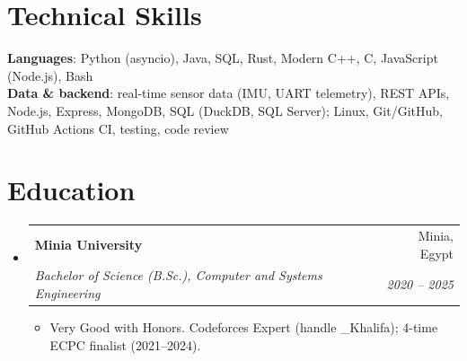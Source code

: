 \documentclass[letterpaper,11pt]{article}
\makeatletter
\newcommand{\resumeItem}[1]{
  \item\small{
    {#1 \vspace{-2pt}}
  }
}
\newcommand{\resumeSubheading}[4]{
  \vspace{-2pt}\item
    \begin{tabular*}{0.97\textwidth}[t]{l@{\extracolsep{\fill}}r}
      \textbf{#1} & #2 \\
      \textit{\small#3} & \textit{\small #4} \\
    \end{tabular*}\vspace{-7pt}
}
\newcommand{\resumeSubHeadingListStart}{\begin{itemize}[leftmargin=0.15in, label={}]}
\newcommand{\resumeSubHeadingListEnd}{\end{itemize}}
\newcommand{\resumeItemListStart}{\begin{itemize}}
\newcommand{\resumeItemListEnd}{\end{itemize}\vspace{-5pt}}
\makeatother
\begin{document}
%
\section{Technical Skills}
 \begin{itemize}[leftmargin=0.15in, label={}]
    \small{\item{
     \textbf{Languages}{: Python (asyncio), Java, SQL, Rust, Modern C++, C, JavaScript (Node.js), Bash} \\
     \textbf{Data \& backend}{: real-time sensor data (IMU, UART telemetry), REST APIs, Node.js, Express, MongoDB, SQL (DuckDB, SQL Server); Linux, Git/GitHub, GitHub Actions CI, testing, code review}
    }}
 \end{itemize}

\section{Education}
  \resumeSubHeadingListStart
    \resumeSubheading
      {Minia University}{Minia, Egypt}
      {Bachelor of Science (B.Sc.), Computer and Systems Engineering}{2020 -- 2025}
      \resumeItemListStart
        \resumeItem{Very Good with Honors. Codeforces Expert (handle \_Khalifa); 4-time ECPC finalist (2021--2024).}
      \resumeItemListEnd
  \resumeSubHeadingListEnd


\end{document}
